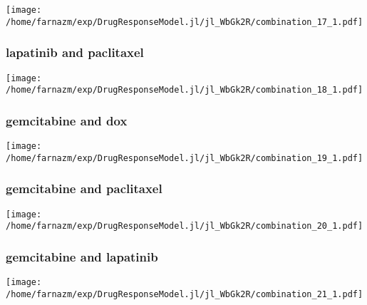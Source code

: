 \documentclass[12pt,a4paper]{article}
\begin{document}
\texttt{[image: /home/farnazm/exp/DrugResponseModel.jl/jl\_WbGk2R/combination\_17\_1.pdf]}

\subsubsection{lapatinib and paclitaxel}

\texttt{[image: /home/farnazm/exp/DrugResponseModel.jl/jl\_WbGk2R/combination\_18\_1.pdf]}

\subsubsection{gemcitabine and dox}

\texttt{[image: /home/farnazm/exp/DrugResponseModel.jl/jl\_WbGk2R/combination\_19\_1.pdf]}

\subsubsection{gemcitabine and paclitaxel}

\texttt{[image: /home/farnazm/exp/DrugResponseModel.jl/jl\_WbGk2R/combination\_20\_1.pdf]}

\subsubsection{gemcitabine and lapatinib}

\texttt{[image: /home/farnazm/exp/DrugResponseModel.jl/jl\_WbGk2R/combination\_21\_1.pdf]}
\end{document}
